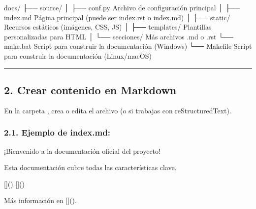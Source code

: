 \documentclass[a4paper,10pt,spanish]{sphinxmanual}
\begin{document}
\begin{sphinxVerbatim}[commandchars=\\\{\}]
docs/
├── source/
│   ├── conf.py        \PYGZlt{}\PYGZhy{} Archivo de configuración principal
│   ├── index.md       \PYGZlt{}\PYGZhy{} Página principal (puede ser index.rst o index.md)
│   ├── \PYGZus{}static/       \PYGZlt{}\PYGZhy{} Recursos estáticos (imágenes, CSS, JS)
│   ├── \PYGZus{}templates/    \PYGZlt{}\PYGZhy{} Plantillas personalizadas para HTML
│   └── secciones/     \PYGZlt{}\PYGZhy{} Más archivos .md o .rst
└── make.bat          \PYGZlt{}\PYGZhy{} Script para construir la documentación (Windows)
└── Makefile          \PYGZlt{}\PYGZhy{} Script para construir la documentación (Linux/macOS)
\end{sphinxVerbatim}


\bigskip\hrule\bigskip



\subsection{2. Crear contenido en Markdown}
\label{\detokenize{configuracion_inicial/008.Generar_HTML:crear-contenido-en-markdown}}
\sphinxAtStartPar
En la carpeta , crea o edita el archivo  (o  si trabajas con reStructuredText).


\subsubsection{2.1. Ejemplo de index.md:}
\label{\detokenize{configuracion_inicial/008.Generar_HTML:ejemplo-de-index-md}}
\begin{sphinxVerbatim}[commandchars=\\\{\}]

¡Bienvenido a la documentación oficial del proyecto!


Esta documentación cubre todas las características clave.


[]()
[]()


Más información en []().
\end{sphinxVerbatim}
\end{document}
